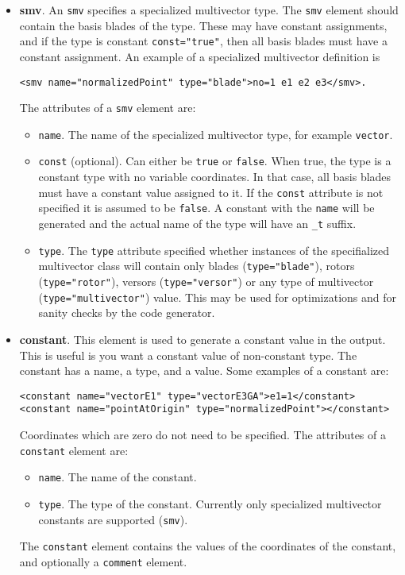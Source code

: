 \documentclass[10pt, a4paper]{article}
\begin{document}
\begin{itemize}
         
\item {\bf smv}. An {\tt smv} specifies a specialized multivector type. 
      The {\tt smv} element should contain the basis blades of the type. These may have constant assignments, and if the
      type is constant {\tt const="true"}, then all basis blades must have a constant assignment. An example of a specialized
      multivector definition is
\begin{verbatim}
<smv name="normalizedPoint" type="blade">no=1 e1 e2 e3</smv>.
\end{verbatim}     
      The attributes of a {\tt smv} element are:
       \begin{itemize}
       \item {\tt name}. The name of the specialized multivector type, for example {\tt vector}.
       \item {\tt const} (optional). Can either be {\tt true} or {\tt false}. When true, the type is a constant type with no
           variable coordinates. In that case, all basis blades must have a constant value assigned to it. If the {\tt const}
           attribute is not specified it is assumed to be {\tt false}. A constant with the {\tt name} will be generated and the
           actual name of the type will have an {\tt \_t} suffix.
       \item {\tt type}. The {\tt type} attribute specified whether instances of the specifialized multivector class will contain
           only blades ({\tt type="blade"}), rotors ({\tt type="rotor"}), versors ({\tt type="versor"}) or any type of multivector  
           ({\tt type="multivector"}) value. This may be used for optimizations and for sanity checks by the code generator.
       \end{itemize}
       
\item {\bf constant}. This element is used to generate a constant value in the output. This is useful is you
      want a constant value of non-constant type. The constant has a name, 
      a type, and a value. Some examples of a constant are:
\begin{verbatim}
<constant name="vectorE1" type="vectorE3GA">e1=1</constant>
<constant name="pointAtOrigin" type="normalizedPoint"></constant>
\end{verbatim}
      Coordinates which are zero do not need to be specified. The attributes of a {\tt constant} element are:
       \begin{itemize}
       \item {\tt name}. The name of the constant.
       \item {\tt type}. The type of the constant. Currently only specialized multivector constants are supported ({\tt smv}).
       \end{itemize}
      The {\tt constant} element contains the values of the coordinates of the constant, and optionally a {\tt comment} element.
      

\end{itemize}
\end{document}
